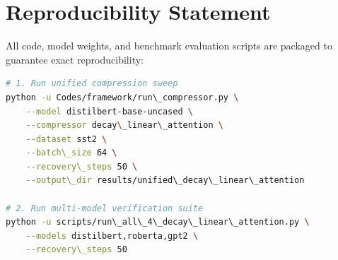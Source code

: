 \section{Reproducibility Statement}
All code, model weights, and benchmark evaluation scripts are packaged to guarantee exact reproducibility:
\begin{lstlisting}[language=bash]
# 1. Run unified compression sweep
python -u Codes/framework/run\_compressor.py \
    --model distilbert-base-uncased \
    --compressor decay\_linear\_attention \
    --dataset sst2 \
    --batch\_size 64 \
    --recovery\_steps 50 \
    --output\_dir results/unified\_decay\_linear\_attention

# 2. Run multi-model verification suite
python -u scripts/run\_all\_4\_decay\_linear\_attention.py \
    --models distilbert,roberta,gpt2 \
    --recovery\_steps 50
\end{lstlisting}
